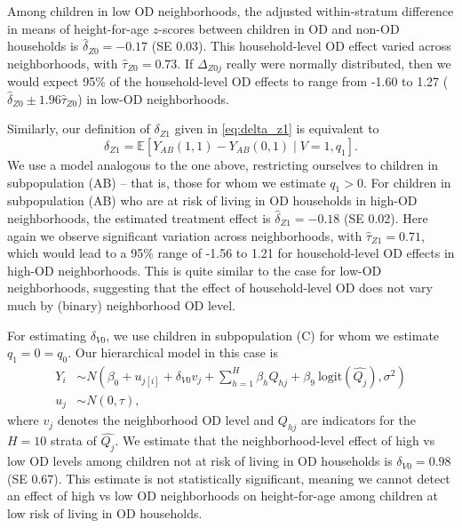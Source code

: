 \documentclass[12pt,a4paper,titlepage]{article}
\begin{document}
Among children in low OD neighborhoods, the adjusted within-stratum difference in means of height-for-age $z$-scores between children in OD and non-OD households is $\widehat{\delta}_{Z0} = -0.17$ (SE 0.03). This household-level OD effect varied across neighborhoods, with $\widehat{\tau}_{Z0} = 0.73$. If $\Delta_{Z0j}$ really were normally distributed, then we would expect 95\% of the household-level OD effects to range from -1.60 to 1.27 ($\widehat{\delta}_{Z0} \pm 1.96 \widehat{\tau}_{Z0}$) in low-OD neighborhoods. 

Similarly, our definition of $\delta_{Z1}$ given in \eqref{eq:delta_z1} is equivalent to
\[
	\delta_{Z1} = \mathbb{E}[Y_{AB}(1,1) - Y_{AB}(0,1) \mid V=1, q_1].
\]
We use a model analogous to the one above, restricting ourselves to children in subpopulation (AB) -- that is, those for whom we estimate $q_1 > 0$. For children in subpopulation (AB) who are at risk of living in OD households in high-OD neighborhoods, the estimated treatment effect is $\widehat{\delta}_{Z1} = -0.18$ (SE 0.02). Here again we observe significant variation across neighborhoods, with $\widehat{\tau}_{Z1} = 0.71$, which would lead to a 95\% range of -1.56 to 1.21 for household-level OD effects in high-OD neighborhoods. This is quite similar to the case for low-OD neighborhoods, suggesting that the effect of household-level OD does not vary much by (binary) neighborhood OD level.

For estimating $\delta_{V0}$, we use children in subpopulation (C) for whom we estimate $q_1 = 0 = q_0$. Our hierarchical model in this case is
\begin{align*}
	Y_i &\sim N \left( \beta_0 + u_{j[i]} + \delta_{V0} v_j + \sum_{h=1}^H \beta_h Q_{hj} + \beta_9 ~ \text{logit}(\widehat{Q_{j}}), \sigma^2 \right) \\
	u_j &\sim N(0, \tau),
\end{align*}
where $v_j$ denotes the neighborhood OD level and $Q_{hj}$ are indicators for the $H=10$ strata of $\widehat{Q_j}$. We estimate that the neighborhood-level effect of high vs low OD levels among children not at risk of living in OD households is $\delta_{V0} = 0.98$ (SE 0.67). This estimate is not statistically significant, meaning we cannot detect an effect of high vs low OD neighborhoods on height-for-age among children at low risk of living in OD households.

%
\end{document}
